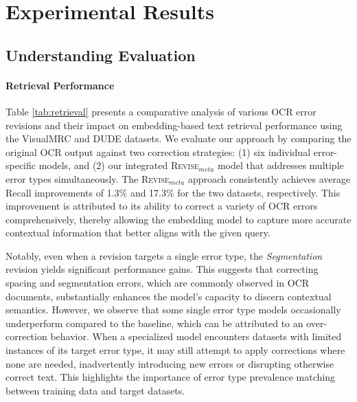 


\section{Experimental Results}



\subsection{Understanding Evaluation}

\paragraph{Retrieval Performance}







Table \ref{tab:retrieval} presents a comparative analysis of various OCR error revisions and their impact on embedding-based text retrieval performance using the VisualMRC and DUDE datasets. We evaluate our approach by comparing the original OCR output against two correction strategies: (1) six individual error-specific models, and (2) our integrated \textsc{Revise}$_{meta}$ model that addresses multiple error types simultaneously.
The \textsc{Revise}$_{meta}$ approach consistently achieves average Recall improvements of 1.3\% and 17.3\% for the two datasets, respectively. This improvement is attributed to its ability to correct a variety of OCR errors comprehensively, thereby allowing the embedding model to capture more accurate contextual information that better aligns with the given query.

Notably, even when a revision targets a single error type, the \textit{Segmentation} revision yields significant performance gains. This suggests that correcting spacing and segmentation errors, which are commonly observed in OCR documents, substantially enhances the model's capacity to discern contextual semantics. However, we observe that some single error type models occasionally underperform compared to the baseline, which can be attributed to an over-correction behavior. When a specialized model encounters datasets with limited instances of its target error type, it may still attempt to apply corrections where none are needed, inadvertently introducing new errors or disrupting otherwise correct text. This highlights the importance of error type prevalence matching between training data and target datasets.

